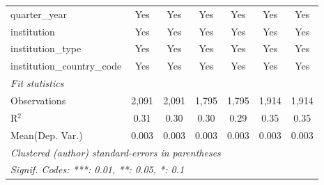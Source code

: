 \begin{tabular}{lcccccc}
   quarter\_year                      & Yes     & Yes      & Yes     & Yes      & Yes     & Yes\\  
   institution                        & Yes     & Yes      & Yes     & Yes      & Yes     & Yes\\  
   institution\_type                  & Yes     & Yes      & Yes     & Yes      & Yes     & Yes\\  
   institution\_country\_code         & Yes     & Yes      & Yes     & Yes      & Yes     & Yes\\  
   \midrule
   \emph{Fit statistics}\\
   Observations                       & 2,091   & 2,091    & 1,795   & 1,795    & 1,914   & 1,914\\  
   R$^2$                              & 0.31    & 0.30     & 0.30    & 0.29     & 0.35    & 0.35\\  
Mean(Dep. Var.) & 0.003 & 0.003 & 0.003 & 0.003 & 0.003 & 0.003 \\
   \midrule \midrule
   \multicolumn{7}{l}{\emph{Clustered (author) standard-errors in parentheses}}\\
   \multicolumn{7}{l}{\emph{Signif. Codes: ***: 0.01, **: 0.05, *: 0.1}}\\
\end{tabular}
\par\endgroup
